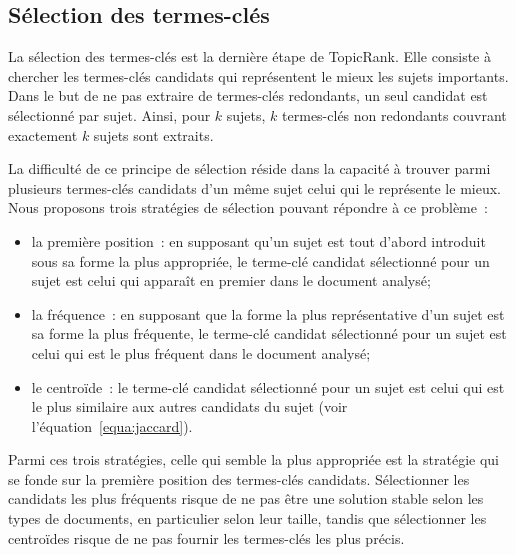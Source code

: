       \subsection{Sélection des termes-clés}
      \label{sec:main-automatic_keyphrase_annotation-unsupervised_automatic_keyphrase_extraction-topicrank-keyphrase_selection}
        La sélection des termes-clés est la dernière étape de TopicRank. Elle
        consiste à chercher les termes-clés candidats qui représentent le mieux
        les sujets importants. Dans le but de ne pas extraire de termes-clés
        redondants, un seul candidat est sélectionné par sujet.
        Ainsi, pour $k$ sujets, $k$ termes-clés non redondants couvrant
        exactement $k$ sujets sont extraits.

        La difficulté de ce principe de sélection réside dans la capacité à
        trouver parmi plusieurs termes-clés candidats d'un même sujet celui qui
        le représente le mieux. Nous proposons trois stratégies de sélection
        pouvant répondre à ce problème~:
        \begin{itemize}
          \item{la première position~: en supposant qu'un sujet est tout d'abord
                introduit sous sa forme la plus appropriée, le terme-clé
                candidat sélectionné pour un sujet est celui qui apparaît en
                premier dans le document analysé;}
          \item{la fréquence~: en supposant que la forme la plus représentative
                d'un sujet est sa forme la plus fréquente, le terme-clé candidat
                sélectionné pour un sujet est celui qui est le plus fréquent
                dans le document analysé;}
          \item{le centroïde~: le terme-clé candidat sélectionné pour un sujet
                est celui qui est le plus similaire aux autres candidats du
                sujet (voir l'équation~\ref{equa:jaccard}).}
        \end{itemize}
        Parmi ces trois stratégies, celle qui semble la plus appropriée est la
        stratégie qui se fonde sur la première position des termes-clés
        candidats. Sélectionner les candidats les plus fréquents risque de ne
        pas être une solution stable selon les types de documents, en
        particulier selon leur taille, tandis que sélectionner les centroïdes
        risque de ne pas fournir les termes-clés les plus précis.

